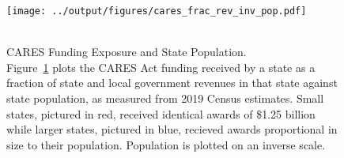 


\begin{center}
\begin{figure}[!ht]
	\centering
	\caption{\\ CARES Funding Exposure and State Population. \\
	{\small Figure~\ref{figure:cares_frac_rev_sl} plots the CARES Act funding received by a state as a fraction of state and local government revenues in that state against state population, as measured from 2019 Census estimates. Small states, pictured in red, received identical awards of \$1.25 billion while larger states, pictured in blue, recieved awards proportional in size to their population. Population is plotted on an inverse scale.}}
	\texttt{[image: ../output/figures/cares\_frac\_rev\_inv\_pop.pdf]}
	\label{figure:cares_frac_rev_sl}
\end{figure}
\end{center}




